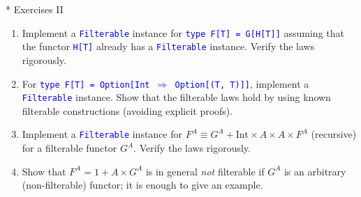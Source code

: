 \documentclass[english]{beamer}
\begin{document}
\begin{frame}{{*} Exercises II}
\begin{enumerate}
\item Implement a \texttt{\textcolor{blue}{\footnotesize{}Filterable}} instance
for \texttt{\textcolor{blue}{\footnotesize{}type F{[}T{]} = G{[}H{[}T{]}{]}}}
assuming that the functor \texttt{\textcolor{blue}{\footnotesize{}H{[}T{]}}}
already has a \texttt{\textcolor{blue}{\footnotesize{}Filterable}}
instance. Verify the laws rigorously.
\item For \texttt{\textcolor{blue}{\footnotesize{}type F{[}T{]} = Option{[}Int
$\Rightarrow$ Option{[}(T, T){]}{]}}}, implement a \texttt{\textcolor{blue}{\footnotesize{}Filterable}}
instance. Show that the filterable laws hold by using known filterable
constructions (avoiding explicit proofs).
\item Implement a \texttt{\textcolor{blue}{\footnotesize{}Filterable}} instance
for $F^{A}\equiv G^{A}+\text{Int}\times A\times A\times F^{A}$ (recursive)
for a filterable functor $G^{A}$. Verify the laws rigorously.
\item Show that $F^{A}=1+A\times G^{A}$ is in general \emph{not} filterable
if $G^{A}$ is an arbitrary (non-filterable) functor; it is enough
to give an example.
\end{enumerate}
\end{frame}
\end{document}
